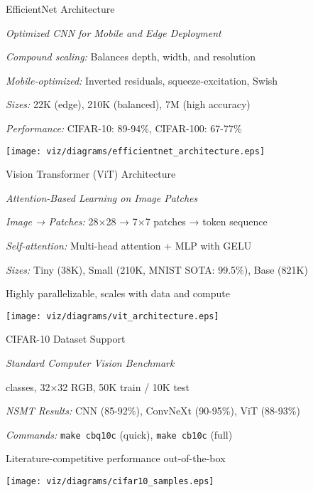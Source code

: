 \begin{slide}[\slideopts,toc={EfficientNet}]{EfficientNet Architecture}
  
  \emph{Optimized CNN for Mobile and Edge Deployment}
  
  \begin{itemize}
    \mpitem \emph{Compound scaling:} Balances depth, width, and resolution
    
    \mpitem \emph{Mobile-optimized:} Inverted residuals, squeeze-excitation, Swish
    
    \mpitem \emph{Sizes:} 22K (edge), 210K (balanced), 7M (high accuracy)
    
    \mpitem \emph{Performance:} CIFAR-10: 89-94\%, CIFAR-100: 67-77\%
  \end{itemize}
  
  \vspace{0.5em}
  \centerline{\texttt{[image: viz/diagrams/efficientnet\_architecture.eps]}}
\end{slide}

\begin{slide}[\slideopts,toc={ViT}]{Vision Transformer (ViT) Architecture}
  
  \emph{Attention-Based Learning on Image Patches}
  
  \begin{itemize}
    \mpitem \emph{Image → Patches:} 28×28 → 7×7 patches → token sequence
    
    \mpitem \emph{Self-attention:} Multi-head attention + MLP with GELU
    
    \mpitem \emph{Sizes:} Tiny (38K), Small (210K, MNIST SOTA: 99.5\%), Base (821K)
    
    \mpitem Highly parallelizable, scales with data and compute
  \end{itemize}
  
  \vspace{0.5em}
  \centerline{\texttt{[image: viz/diagrams/vit\_architecture.eps]}}
\end{slide}

\begin{slide}[\slideopts,toc={CIFAR-10}]{CIFAR-10 Dataset Support}
  
  \emph{Standard Computer Vision Benchmark}
  
  \begin{itemize}
     classes, 32×32 RGB, 50K train / 10K test
    
    \mpitem \emph{NSMT Results:} CNN (85-92\%), ConvNeXt (90-95\%), ViT (88-93\%)
    
    \mpitem \emph{Commands:} \texttt{make cbq10c} (quick), \texttt{make cb10c} (full)
    
    \mpitem Literature-competitive performance out-of-the-box
  \end{itemize}
  
  \vspace{0.5em}
  \centerline{\texttt{[image: viz/diagrams/cifar10\_samples.eps]}}
\end{slide}

